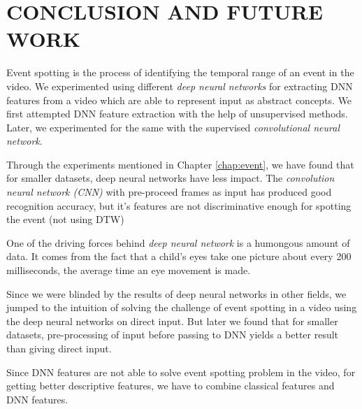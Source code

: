 \chapter{CONCLUSION AND FUTURE WORK} 
\label{chap:concl}
Event spotting is the process of identifying the temporal range of an event in the video.  We experimented using  different \textit{deep neural networks} for extracting DNN features from a video which are able to represent input as abstract concepts.  We first attempted  DNN feature extraction with the help of unsupervised methods.  Later, we experimented for the same with the supervised \textit{convolutional neural network}.

Through the experiments mentioned in Chapter \ref{chap:event}, we have found that for smaller datasets, deep neural networks have less impact.  The \textit{convolution neural network (CNN)} with pre-proceed frames as input has produced good recognition accuracy, but it's features are not discriminative enough for spotting the event (not using DTW)

One of the driving forces behind \textit{deep neural network} is a humongous amount of data.  It comes from the fact that a child's eyes take one picture about every 200 milliseconds, the average time an eye movement is made. 

Since we were blinded by the results of deep neural networks in other fields, we jumped to the intuition of solving the challenge of event spotting in a video using the deep neural networks on direct input.  But later we found that for smaller datasets, pre-processing of input before passing to DNN yields a better result than giving direct input.

Since DNN features are not able to solve event spotting problem in the video, for getting better descriptive features, we have to combine classical features and DNN features.  

